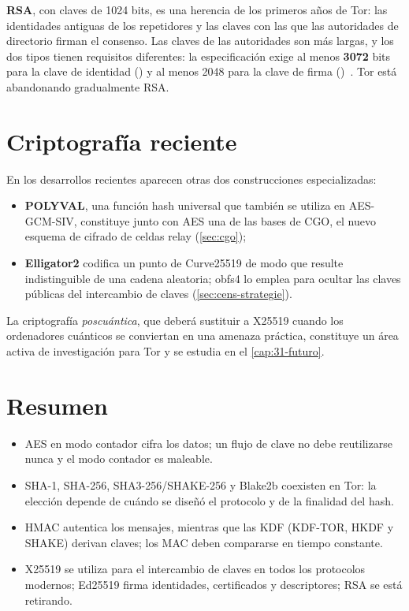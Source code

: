 \textbf{RSA}, con claves de 1024 bits, es una herencia de los primeros años de Tor: las identidades antiguas de los repetidores y las claves con las que las autoridades de directorio firman el consenso. Las claves de las autoridades son más largas, y los dos tipos tienen requisitos diferentes: la especificación exige al menos \textbf{3072} bits para la clave de identidad () y al menos 2048 para la clave de firma ()~. Tor está abandonando gradualmente RSA.

\section{Criptografía reciente}\label{sec:cripto-recente}

En los desarrollos recientes aparecen otras dos construcciones especializadas:
\begin{itemize}
  \item \textbf{POLYVAL}, una función hash universal que también se utiliza en AES-GCM-SIV, constituye junto con AES una de las bases de CGO, el nuevo esquema de cifrado de celdas relay (\cref{sec:cgo});
  \item \textbf{Elligator2} codifica un punto de Curve25519 de modo que resulte indistinguible de una cadena aleatoria; obfs4 lo emplea para ocultar las claves públicas del intercambio de claves (\cref{sec:cens-strategie}).
\end{itemize}
La criptografía \emph{poscuántica}, que deberá sustituir a X25519 cuando los ordenadores cuánticos se conviertan en una amenaza práctica, constituye un área activa de investigación para Tor y se estudia en el \cref{cap:31-futuro}.

\section*{Resumen}
\begin{itemize}
  \item AES en modo contador cifra los datos; un flujo de clave no debe reutilizarse nunca y el modo contador es maleable.
  \item SHA-1, SHA-256, SHA3-256/SHAKE-256 y Blake2b coexisten en Tor: la elección depende de cuándo se diseñó el protocolo y de la finalidad del hash.
  \item HMAC autentica los mensajes, mientras que las KDF (KDF-TOR, HKDF y SHAKE) derivan claves; los MAC deben compararse en tiempo constante.
  \item X25519 se utiliza para el intercambio de claves en todos los protocolos modernos; Ed25519 firma identidades, certificados y descriptores; RSA se está retirando.
\end{itemize}

